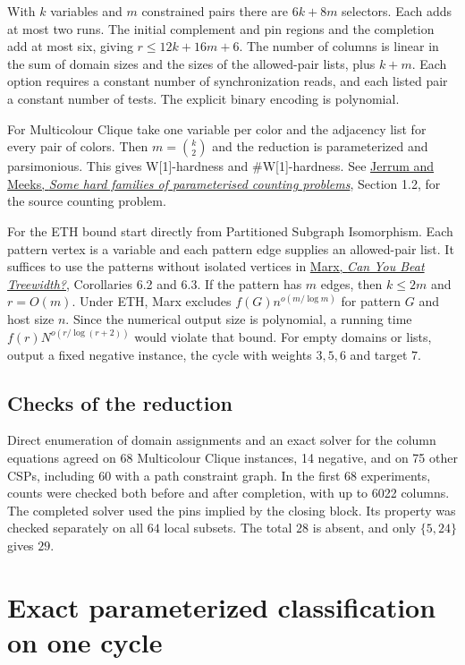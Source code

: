 \documentclass[11pt,a4paper]{article}
\numberwithin{equation}{section}
\begin{document}
With \(k\) variables and \(m\) constrained pairs there are \(6k+8m\) selectors. Each adds at most two runs. The initial complement and pin regions and the completion add at most six, giving \(r\le12k+16m+6\). The number of columns is linear in the sum of domain sizes and the sizes of the allowed-pair lists, plus \(k+m\). Each option requires a constant number of synchronization reads, and each listed pair a constant number of tests. The explicit binary encoding is polynomial.

For Multicolour Clique take one variable per color and the adjacency list for every pair of colors. Then \(m=\binom{k}{2}\) and the reduction is parameterized and parsimonious. This gives W{[}1{]}-hardness and \#W{[}1{]}-hardness. See \href{https://eprints.gla.ac.uk/97129/1/97129.pdf}{Jerrum and Meeks, \emph{Some hard families of parameterised counting problems}}, Section 1.2, for the source counting problem.

For the ETH bound start directly from Partitioned Subgraph Isomorphism. Each pattern vertex is a variable and each pattern edge supplies an allowed-pair list. It suffices to use the patterns without isolated vertices in \href{https://toc.cs.uchicago.edu/articles/v006a005/v006a005.pdf}{Marx, \emph{Can You Beat Treewidth?}}, Corollaries 6.2 and 6.3. If the pattern has \(m\) edges, then \(k\le2m\) and \(r=O(m)\). Under ETH, Marx excludes \(f(G)n^{o(m/\log m)}\) for pattern \(G\) and host size \(n\). Since the numerical output size is polynomial, a running time \(f(r)N^{o(r/\log(r+2))}\) would violate that bound. For empty domains or lists, output a fixed negative instance, the cycle with weights \(3,5,6\) and target \(7\).

\subsection{Checks of the reduction}\label{checks-of-the-reduction}

Direct enumeration of domain assignments and an exact solver for the column equations agreed on 68 Multicolour Clique instances, 14 negative, and on 75 other CSPs, including 60 with a path constraint graph. In the first 68 experiments, counts were checked both before and after completion, with up to 6022 columns. The completed solver used the pins implied by the closing block. Its property was checked separately on all \(64\) local subsets. The total \(28\) is absent, and only \(\{5,24\}\) gives \(29\).

\section{Exact parameterized classification on one cycle}\label{exact-parameterized-classification-on-one-cycle}
\end{document}
